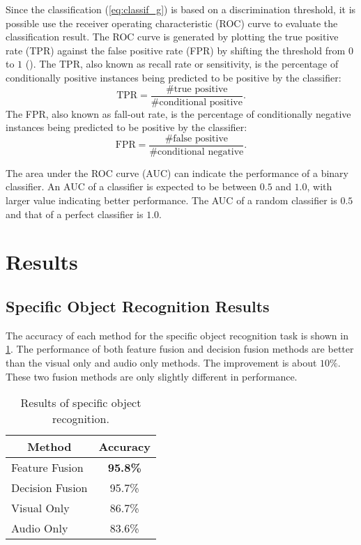 \documentclass[12pt,final,twoside]{report}
\begin{document}
Since the classification (\cref{eq:classif_g}) is based on a discrimination threshold, it is possible use the receiver operating characteristic (ROC) curve to evaluate the classification result. The ROC curve is generated by plotting the true positive rate (TPR) against the false positive rate (FPR) by shifting the threshold from $0$ to $1$ (). The TPR, also known as recall rate or sensitivity, is the percentage of conditionally positive instances being predicted to be positive by the classifier:
\[ \text{TPR} =  \frac{\text{\# true positive}}{\text{\# conditional positive}} . \]
The FPR, also known as fall-out rate, is the percentage of conditionally negative instances being predicted to be positive by the classifier:
\[ \text{FPR} =  \frac{\text{\# false positive}}{\text{\# conditional negative}} . \]

The area under the ROC curve (AUC) can indicate the performance of a binary classifier. An AUC of a classifier is expected to be between $0.5$ and $1.0$, with larger value indicating better performance. The AUC of a random classifier is $0.5$ and that of a perfect classifier is $1.0$.

\section{Results}
\subsection{Specific Object Recognition Results}
The accuracy of each method for the specific object recognition task is shown in \cref{tab:spec}. The performance of both feature fusion and decision fusion methods are better than the visual only and audio only methods. The improvement is about $10\%$. These two fusion methods are only slightly different in performance.

\begin{table}
  \caption{Results of specific object recognition.}
  \label{tab:spec}
  \centering
  \begin{tabular}[h!]{lc}
    \toprule
    \multicolumn{1}{c}{Method} & Accuracy \\ \midrule
    Feature Fusion & \textbf{95.8\%} \\
    Decision Fusion  & 95.7\% \\
    Visual Only & 86.7\% \\
    Audio Only & 83.6\% \\
    \bottomrule
  \end{tabular}
\end{table}
\end{document}
